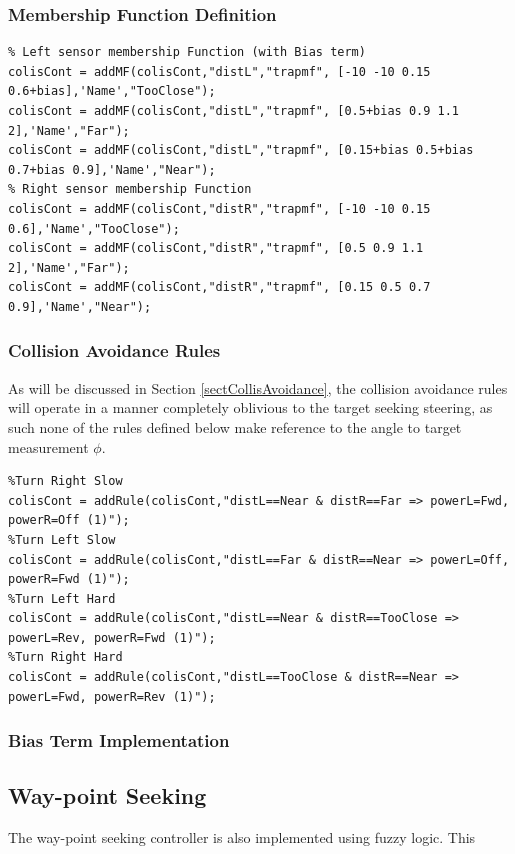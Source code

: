 \documentclass[11pt]{article}
\numberwithin{equation}{section}
\begin{document}
\subsubsection{Membership Function Definition}
\label{sec:org53b9142}
\begin{verbatim}
% Left sensor membership Function (with Bias term)
colisCont = addMF(colisCont,"distL","trapmf", [-10 -10 0.15 0.6+bias],'Name',"TooClose");
colisCont = addMF(colisCont,"distL","trapmf", [0.5+bias 0.9 1.1 2],'Name',"Far");
colisCont = addMF(colisCont,"distL","trapmf", [0.15+bias 0.5+bias 0.7+bias 0.9],'Name',"Near");
% Right sensor membership Function
colisCont = addMF(colisCont,"distR","trapmf", [-10 -10 0.15 0.6],'Name',"TooClose");
colisCont = addMF(colisCont,"distR","trapmf", [0.5 0.9 1.1 2],'Name',"Far");
colisCont = addMF(colisCont,"distR","trapmf", [0.15 0.5 0.7 0.9],'Name',"Near");
\end{verbatim}

\subsubsection{Collision Avoidance Rules}
\label{sec:orge90c995}
As will be discussed in Section \ref{sectCollisAvoidance}, the collision avoidance rules will operate in a manner completely oblivious to the target seeking steering, as such none of the rules defined below make reference to the angle to target measurement \(\phi\).

\begin{verbatim}
%Turn Right Slow
colisCont = addRule(colisCont,"distL==Near & distR==Far => powerL=Fwd, powerR=Off (1)");
%Turn Left Slow
colisCont = addRule(colisCont,"distL==Far & distR==Near => powerL=Off, powerR=Fwd (1)");
%Turn Left Hard
colisCont = addRule(colisCont,"distL==Near & distR==TooClose => powerL=Rev, powerR=Fwd (1)");
%Turn Right Hard
colisCont = addRule(colisCont,"distL==TooClose & distR==Near => powerL=Fwd, powerR=Rev (1)");
\end{verbatim}

\subsubsection{Bias Term Implementation}
\label{sec:org28907dc}

\subsection{Way-point Seeking \label{secWaypointSeeking}}
\label{sec:org6fe2cc1}
The way-point seeking controller is also implemented using fuzzy logic. This
\end{document}
